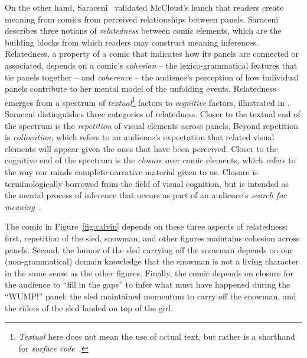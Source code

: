 On the other hand, Saraceni~\cite{saraceni2016relatedness} validated
McCloud's hunch that readers create meaning from comics from perceived
relationships between panels.
Saraceni describes three notions of \emph{relatedness} between comic
elements, which are the building blocks from which readers may construct
meaning inferences.  Relatedness, a property of a comic that indicates how
its panels are connected or associated, depends on a comic's
\emph{cohesion} -- the lexico-grammatical features that tie panels together
-- and \emph{coherence} -- the audience's perception of how individual
panels contribute to her mental model of the unfolding events. Relatedness
emerges from a spectrum of \emph{textual}\footnote{\emph{Textual} here does
not mean the use of actual text, but rather is a shorthand for
\emph{surface code}~\cite{zwaan1998situation}.} factors to \emph{cognitive}
factors, illustrated in .
%
Saraceni distinguishes three categories of relatedness.  Closer to the
textual end of the spectrum is the \emph{repetition} of visual elements
across panels. Beyond repetition is \emph{collocation}, which refers to an
audience's expectation that related visual elements will appear given the
ones that have been perceived. Closer to the cognitive end of the spectrum
is the \emph{closure} over comic elements, which refers to the way our
minds complete narrative material given to us. Closure is terminologically
borrowed from the field of visual cognition, but is intended as the mental
process of inference that occurs as part of an audience's \emph{search for
meaning}~\cite{gerrig1994readers}.

%
The comic in Figure~\ref{fig:calvin} depends on these three 
aspects of relatedness: first, repetition of the sled, snowman, and other
figures maintains cohesion across panels. Second, the humor of the sled
carrying off the snowman depends on our (non-grammatical) domain knowledge
that the snowman is not a living character in the same sense as the other
figures. Finally, the comic depends on closure for the audience to ``fill
in the gaps'' to infer what must have happened during the ``WUMP!'' panel:
the sled maintained momentum to carry off the snowman, and the riders of
the sled landed on top of the girl.

